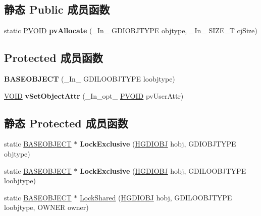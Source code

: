 \subsection*{静态 Public 成员函数}
\begin{DoxyCompactItemize}
\item 
\mbox{\label{class_b_a_s_e_o_b_j_e_c_t_a8da6012c8cd450e038e58d01e5161793}} 
static \hyperlink{interfacevoid}{P\+V\+O\+ID} {\bfseries pv\+Allocate} (\+\_\+\+In\+\_\+ G\+D\+I\+O\+B\+J\+T\+Y\+PE objtype, \+\_\+\+In\+\_\+ S\+I\+Z\+E\+\_\+T cj\+Size)
\end{DoxyCompactItemize}
\subsection*{Protected 成员函数}
\begin{DoxyCompactItemize}
\item 
\mbox{\label{class_b_a_s_e_o_b_j_e_c_t_a374947d809ce769b07c88b0d8a7c1eca}} 
{\bfseries B\+A\+S\+E\+O\+B\+J\+E\+CT} (\+\_\+\+In\+\_\+ G\+D\+I\+L\+O\+O\+B\+J\+T\+Y\+PE loobjtype)
\item 
\mbox{\label{class_b_a_s_e_o_b_j_e_c_t_a16d22442d2cc20bcb7055ef470045cf0}} 
\hyperlink{interfacevoid}{V\+O\+ID} {\bfseries v\+Set\+Object\+Attr} (\+\_\+\+In\+\_\+opt\+\_\+ \hyperlink{interfacevoid}{P\+V\+O\+ID} pv\+User\+Attr)
\end{DoxyCompactItemize}
\subsection*{静态 Protected 成员函数}
\begin{DoxyCompactItemize}
\item 
\mbox{\label{class_b_a_s_e_o_b_j_e_c_t_a5482fbbcb9e460e28f3656618c45c497}} 
static \hyperlink{class_b_a_s_e_o_b_j_e_c_t}{B\+A\+S\+E\+O\+B\+J\+E\+CT} $\ast$ {\bfseries Lock\+Exclusive} (\hyperlink{interfacevoid}{H\+G\+D\+I\+O\+BJ} hobj, G\+D\+I\+O\+B\+J\+T\+Y\+PE objtype)
\item 
\mbox{\label{class_b_a_s_e_o_b_j_e_c_t_a41b19788536192cdd2ce615e1873bcea}} 
static \hyperlink{class_b_a_s_e_o_b_j_e_c_t}{B\+A\+S\+E\+O\+B\+J\+E\+CT} $\ast$ {\bfseries Lock\+Exclusive} (\hyperlink{interfacevoid}{H\+G\+D\+I\+O\+BJ} hobj, G\+D\+I\+L\+O\+O\+B\+J\+T\+Y\+PE loobjtype)
\item 
static \hyperlink{class_b_a_s_e_o_b_j_e_c_t}{B\+A\+S\+E\+O\+B\+J\+E\+CT} $\ast$ \hyperlink{class_b_a_s_e_o_b_j_e_c_t_a1048a253a09ae9f3eacb3b3946efbbc4}{Lock\+Shared} (\hyperlink{interfacevoid}{H\+G\+D\+I\+O\+BJ} hobj, G\+D\+I\+L\+O\+O\+B\+J\+T\+Y\+PE loobjtype, O\+W\+N\+ER owner)
\end{DoxyCompactItemize}


